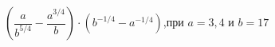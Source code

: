 \begin{ex}[type=simplify_calculate]
	\begin{condition}
		\( \left( \dfrac{a}{b^{5/4}}-\dfrac{a^{3/4}}{b} \right)\cdot(b^{-1/4}-a^{-1/4}) \),\quad при \( a=3,4 \) и \( b=17 \)
	\end{condition}
\end{ex}